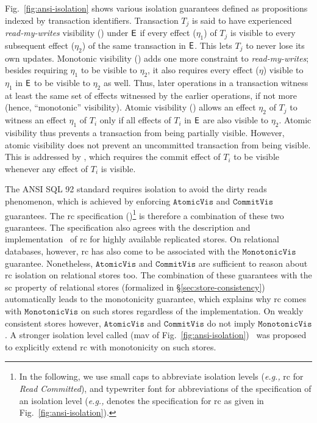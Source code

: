 Fig.~\ref{fig:ansi-isolation} shows various isolation guarantees
defined as propositions indexed by transaction identifiers.
Transaction $T_j$ is said to have experienced \emph{read-my-writes}
visibility () under $\textsf{E}$ if every effect ($\eta_1$) of $T_j$
is visible to every subsequent effect ($\eta_2$) of the same
transaction in $\textsf{E}$.  This lets $T_j$ to never lose its own updates.
Monotonic visibility () adds one more constraint to
\emph{read-my-writes}; besides requiring $\eta_1$ to be visible to
$\eta_2$, it also requires every effect ($\eta$) visible to $\eta_1$
in $\textsf{E}$ to be visible to $\eta_2$ as well. Thus, later operations in a
transaction witness at least the same set of effects witnessed by the
earlier operations, if not more (hence, ``monotonic'' visibility).
Atomic visibility () allows an effect $\eta_2$ of $T_j$
to witness an effect $\eta_1$ of $T_i$ only if all effects of $T_i$ in
$\textsf{E}$ are also visible to $\eta_2$. Atomic visibility thus prevents a
transaction from being partially visible.  However, atomic visibility
does not prevent an uncommitted transaction from being visible. This
is addressed by , which requires the commit effect of
$T_i$ to be visible whenever any effect of $T_i$ is visible.

The ANSI SQL 92 standard requires  isolation to
avoid the dirty reads phenomenon, which is achieved by enforcing
$\mathtt{AtomicVis}$ and $\mathtt{CommitVis}$ guarantees. The {\sc rc}
specification ()\footnote{In the following, we use small caps to
abbreviate isolation levels (\emph{e.g.,} {\sc rc} for \emph{Read
Committed}), and typewriter font for abbreviations of the
specification of an isolation level (\emph{e.g.,}  denotes the
specification for {\sc rc} as given in
Fig.~\ref{fig:ansi-isolation}).} is therefore a combination of these
two guarantees. The specification also agrees with the description and
implementation~\cite{bailishat,pldi15} of {\sc rc} for highly
available replicated stores. On relational databases, however, {\sc
rc} has also come to be associated with the $\mathtt{MonotonicVis}$
guarantee.  Nonetheless, $\mathtt{AtomicVis}$ and $\mathtt{CommitVis}$
are sufficient to reason about {\sc rc} isolation on relational stores
too. The combination of these guarantees with the {\sc sc} property of
relational stores (formalized in \S\ref{sec:store-consistency})
automatically leads to the monotonicity guarantee, which explains why
{\sc rc} comes with $\mathtt{MonotonicVis}$ on such stores regardless
of the implementation. On weakly consistent stores however,
$\mathtt{AtomicVis}$ and $\mathtt{CommitVis}$ do not imply
$\mathtt{MonotonicVis}$. A stronger isolation level called
 ({\sc mav} of
Fig.~\ref{fig:ansi-isolation})~\cite{bailishat} was proposed to
explicitly extend {\sc rc} with monotonicity on such stores. 


